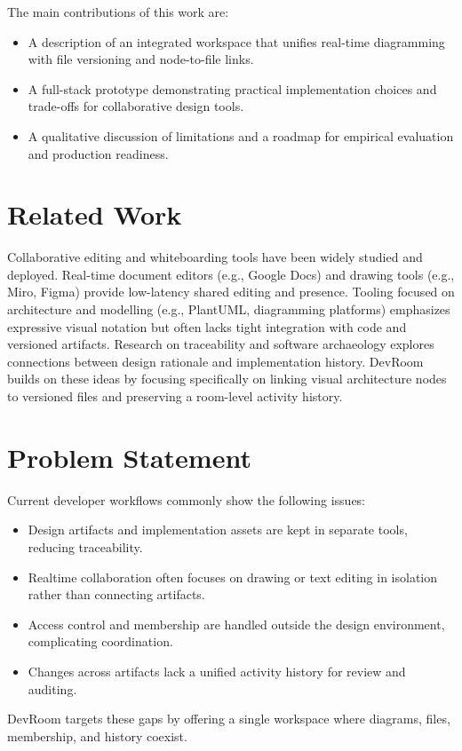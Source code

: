 \documentclass[conference]{IEEEtran}
\begin{document}
The main contributions of this work are:
\begin{itemize}
\item A description of an integrated workspace that unifies real-time diagramming with file versioning and node-to-file links.
\item A full-stack prototype demonstrating practical implementation choices and trade-offs for collaborative design tools.
\item A qualitative discussion of limitations and a roadmap for empirical evaluation and production readiness.
\end{itemize}

\section{Related Work}
Collaborative editing and whiteboarding tools have been widely studied and deployed. Real-time document editors (e.g., Google Docs) and drawing tools (e.g., Miro, Figma) provide low-latency shared editing and presence. Tooling focused on architecture and modelling (e.g., PlantUML, diagramming platforms) emphasizes expressive visual notation but often lacks tight integration with code and versioned artifacts. Research on traceability and software archaeology explores connections between design rationale and implementation history. DevRoom builds on these ideas by focusing specifically on linking visual architecture nodes to versioned files and preserving a room-level activity history.

\section{Problem Statement}
Current developer workflows commonly show the following issues:
\begin{itemize}
\item Design artifacts and implementation assets are kept in separate tools, reducing traceability.
\item Realtime collaboration often focuses on drawing or text editing in isolation rather than connecting artifacts.
\item Access control and membership are handled outside the design environment, complicating coordination.
\item Changes across artifacts lack a unified activity history for review and auditing.
\end{itemize}

DevRoom targets these gaps by offering a single workspace where diagrams, files, membership, and history coexist.
\end{document}
